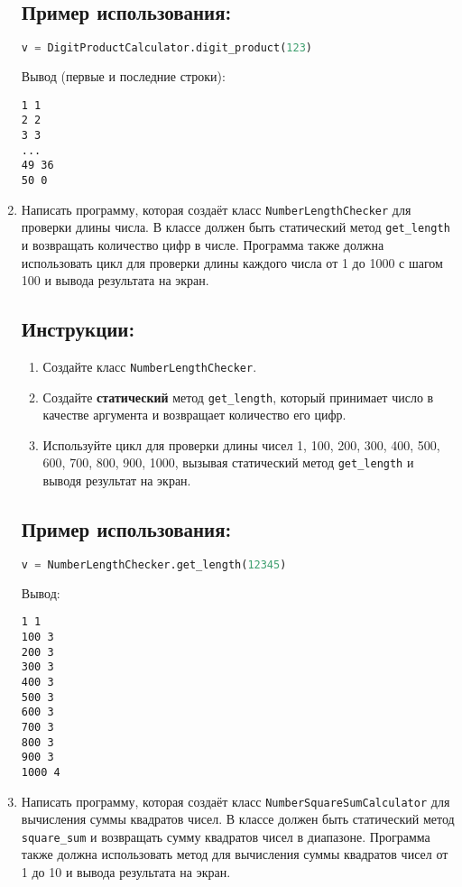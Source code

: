 \begin{enumerate}
\subsection*{Пример использования:}
\begin{lstlisting}[language=Python]
    v = DigitProductCalculator.digit_product(123)
\end{lstlisting}
Вывод (первые и последние строки):
\begin{verbatim}
1 1
2 2
3 3
...
49 36
50 0
\end{verbatim}

\item
Написать программу, которая создаёт класс \texttt{NumberLengthChecker} 
для проверки длины числа. В классе должен быть статический метод
\texttt{get\_length} и возвращать количество цифр в числе. 
Программа также должна использовать цикл для проверки длины каждого числа от 
1 до 1000 с шагом 100 и вывода результата на экран.

\subsection*{Инструкции:}
\begin{enumerate}
    \item Создайте класс \texttt{NumberLengthChecker}.
    \item Создайте \textbf{статический} метод \texttt{get\_length}, который принимает число в качестве аргумента и возвращает количество его цифр.
    \item Используйте цикл для проверки длины чисел 1, 100, 200, 300, 400, 500, 600, 700, 800, 900, 1000, вызывая статический метод \texttt{get\_length} и выводя результат на экран.
\end{enumerate}

\subsection*{Пример использования:}
\begin{lstlisting}[language=Python]
    v = NumberLengthChecker.get_length(12345)
\end{lstlisting}
Вывод:
\begin{verbatim}
1 1
100 3
200 3
300 3
400 3
500 3
600 3
700 3
800 3
900 3
1000 4
\end{verbatim}

\item
Написать программу, которая создаёт класс \texttt{NumberSquareSumCalculator} 
для вычисления суммы квадратов чисел. В классе должен быть статический метод
\texttt{square\_sum} и возвращать сумму квадратов чисел в диапазоне. 
Программа также должна использовать метод для вычисления суммы квадратов чисел от 
1 до 10 и вывода результата на экран.


\end{enumerate}
